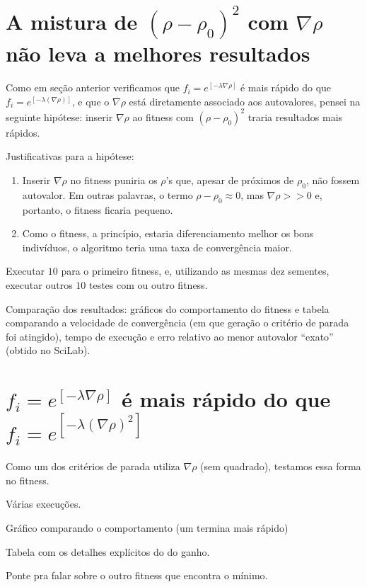 	\section{A mistura de $(\rho - \rho_0)^2$ com $\nabla\rho$ não leva a melhores resultados}
	
	Como em seção anterior verificamos que $f_i = e^{[-\lambda \nabla \rho]}$ é mais rápido do que $f_i = e^{[-\lambda (\nabla \rho)]}$, e que o $\nabla\rho$ está diretamente associado aos autovalores, pensei na seguinte hipótese: inserir $\nabla \rho$ ao fitness com $(\rho - \rho_0)^2$ traria resultados mais rápidos.
	
	Justificativas para a hipótese: 
	
	\begin{enumerate}
		\item Inserir $\nabla \rho$ no fitness puniria os $\rho$'s que, apesar de próximos de $\rho_0$, não fossem autovalor. Em outras palavras, o termo $\rho - \rho_0 \approx 0$, mas $\nabla \rho >> 0$ e, portanto, o fitness ficaria pequeno.
		
		\item Como o fitness, a princípio, estaria diferenciamento melhor os bons indivíduos, o algoritmo teria uma taxa de convergência maior.
		
	\end{enumerate}
	
		Executar $10$ para o primeiro fitness, e, utilizando as mesmas dez sementes, executar outros $10$ testes com ou outro fitness.
		
		Comparação dos resultados: gráficos do comportamento do fitness e tabela comparando a velocidade de convergência (em que geração o critério de parada foi atingido), tempo de execução e erro relativo ao menor autovalor ``exato'' (obtido no SciLab).

	\section{$f_i = e^{[-\lambda \nabla \rho]}$ é mais rápido do que $f_i = e^{[-\lambda (\nabla \rho)^2]}$}
	
	Como um dos critérios de parada utiliza $\nabla \rho$ (sem quadrado), testamos essa forma no fitness.
	
	Várias execuções.
	
	Gráfico comparando o comportamento (um termina mais rápido)
	
	Tabela com os detalhes explícitos do do ganho.
	
	Ponte pra falar sobre o outro fitness que encontra o mínimo.
	
